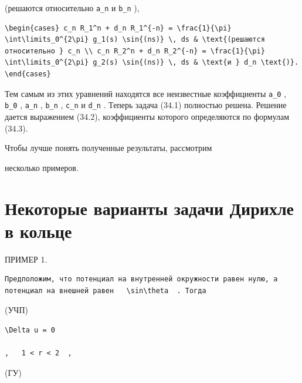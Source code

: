 \documentclass[
  ukrainian,
]{article}
\begin{document}
(решаются относительно \texttt{a\_n} и \texttt{b\_n} ),

\begin{verbatim}
\begin{cases} c_n R_1^n + d_n R_1^{-n} = \frac{1}{\pi} \int\limits_0^{2\pi} g_1(s) \sin{(ns)} \, ds & \text{(решаются относительно } c_n \\ c_n R_2^n + d_n R_2^{-n} = \frac{1}{\pi} \int\limits_0^{2\pi} g_2(s) \sin{(ns)} \, ds & \text{и } d_n \text{)}. \end{cases}
\end{verbatim}

Тем самым из этих уравнений находятся все неизвестные коэффициенты
\texttt{a\_0} , \texttt{b\_0} , \texttt{a\_n} , \texttt{b\_n} ,
\texttt{c\_n} и \texttt{d\_n} . Теперь задача (34.1) полностью решена.
Решение дается выражением (34.2), коэффициенты которого определяются по
формулам (34.3).

Чтобы лучше понять полученные результаты, рассмотрим

несколько примеров.

\section{Некоторые варианты задачи Дирихле в
кольце}\label{ux43dux435ux43aux43eux442ux43eux440ux44bux435-ux432ux430ux440ux438ux430ux43dux442ux44b-ux437ux430ux434ux430ux447ux438-ux434ux438ux440ux438ux445ux43bux435-ux432-ux43aux43eux43bux44cux446ux435}

ПРИМЕР 1.

\begin{verbatim}
Предположим, что потенциал на внутренней окружности равен нулю, а потенциал на внешней равен   \sin\theta  . Тогда
\end{verbatim}

(УЧП)

\begin{verbatim}
\Delta u = 0

,   1 < r < 2  ,
\end{verbatim}

(ГУ)
\end{document}
